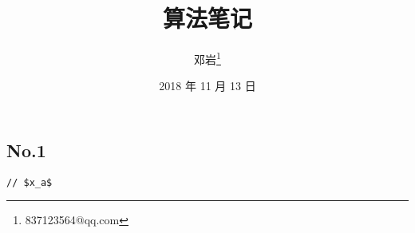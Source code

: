 \documentclass[12pt,a3paper]{article}
\begin{document}
\title{算法笔记}
\author{邓岩\footnote{837123564@qq.com}}
\date{2018 年 11 月 13 日}
\maketitle
\thispagestyle{empty}
\newpage
\tableofcontents
\newpage


\section{\color[rgb]{0.2,0.4,0.6}{第一章}}
\subsection{No.1}
\begin{adjustwidth}{2em}{0em}
\begin{verbatim}
// $x_a$
\end{verbatim}
\end{adjustwidth}




\newpage


\end{document}
